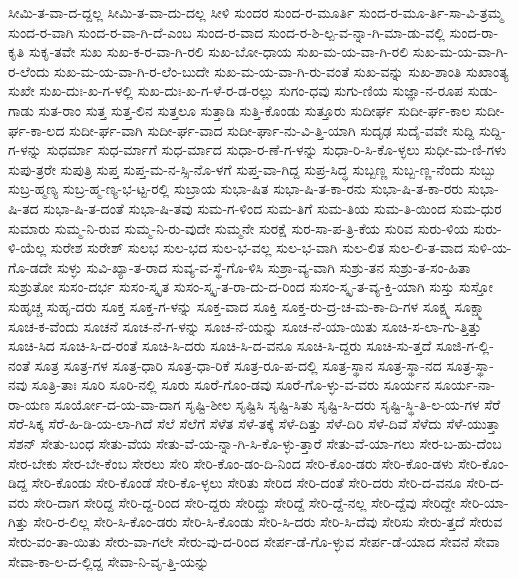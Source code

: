 {ಸೀಮಿ-ತ-ವಾ-ದ-ದ್ದಲ್ಲ
ಸೀಮಿ-ತ-ವಾ-ದು-ದಲ್ಲ
ಸೀಳಿ
ಸುಂದರ
ಸುಂದ-ರ-ಮೂರ್ತಿ
ಸುಂದ-ರ-ಮೂ-ರ್ತಿ-ಸಾ-ವಿ-ತ್ರಮ್ಮ
ಸುಂದ-ರ-ವಾಗಿ
ಸುಂದ-ರ-ವಾ-ಗಿ-ದೆ-ಎಂಬ
ಸುಂದ-ರ-ವಾದ
ಸುಂದ-ರ-ಶಿ-ಲ್ಪ-ವ-ನ್ನಾ-ಗಿ-ಮಾ-ಡು-ವಲ್ಲಿ
ಸುಂದ-ರಾ-ಕೃತಿ
ಸುಕೃ-ತವೇ
ಸುಖ
ಸುಖ-ಕ-ರ-ವಾ-ಗಿ-ರಲಿ
ಸುಖ-ಬೋ-ಧಾಯ
ಸುಖ-ಮ-ಯ-ವಾ-ಗಿ-ರಲಿ
ಸುಖ-ಮ-ಯ-ವಾ-ಗಿ-ರ-ಲೆಂದು
ಸುಖ-ಮ-ಯ-ವಾ-ಗಿ-ರ-ಲೆಂ-ಬುದೇ
ಸುಖ-ಮ-ಯ-ವಾ-ಗಿ-ರು-ವಂತೆ
ಸುಖ-ವನ್ನು
ಸುಖ-ಶಾಂತಿ
ಸುಖಾಂತ್ಯ
ಸುಖೇ
ಸುಖ-ದುಃ-ಖ-ಗ-ಳಲ್ಲಿ
ಸುಖ-ದುಃ-ಖ-ಗ-ಳೆ-ರ-ಡ-ರಲ್ಲು
ಸುಗಂ-ಧವು
ಸುಗು-ಣಿಯ
ಸುಜ್ಞಾ-ನ-ರೂಪ
ಸುಡು-ಗಾಡು
ಸುತ-ರಾಂ
ಸುತ್ತ
ಸುತ್ತ-ಲಿನ
ಸುತ್ತಲೂ
ಸುತ್ತಾಡಿ
ಸುತ್ತಿ-ಕೊಂಡು
ಸುತ್ತೂರು
ಸುದೀರ್ಘ
ಸುದೀ-ರ್ಘ-ಕಾಲ
ಸುದೀ-ರ್ಘ-ಕಾ-ಲದ
ಸುದೀ-ರ್ಘ-ವಾಗಿ
ಸುದೀ-ರ್ಘ-ವಾದ
ಸುದೀ-ರ್ಘಾ-ನು-ವಿ-ತ್ತಿ-ಯಾಗಿ
ಸುದೃಢ
ಸುದೈ-ವವೇ
ಸುದ್ದಿ
ಸುದ್ದಿ-ಗ-ಳನ್ನು
ಸುಧರ್ಮಾ
ಸುಧ-ರ್ಮಾಗೆ
ಸುಧ-ರ್ಮಾದ
ಸುಧಾ-ರ-ಣೆ-ಗ-ಳನ್ನು
ಸುಧಾ-ರಿ-ಸಿ-ಕೊ-ಳ್ಳಲು
ಸುಧೀ-ಮ-ಣಿ-ಗಳು
ಸುಪು-ತ್ರರೇ
ಸುಪುತ್ರಿ
ಸುಪ್ತ
ಸುಪ್ತ-ಮ-ನ-ಸ್ಸಿ-ನೊ-ಳಗೆ
ಸುಪ್ತ-ವಾ-ಗಿದ್ದ
ಸುಪ್ರ-ಸಿದ್ಧ
ಸುಬ್ಬಣ್ಣ
ಸುಬ್ಬ-ಣ್ಣ-ನೆಂದು
ಸುಬ್ಬು
ಸುಬ್ರ-ಹ್ಮಣ್ಯ
ಸುಬ್ರ-ಹ್ಮ-ಣ್ಯ-ಭ-ಟ್ಟ-ರಲ್ಲಿ
ಸುಬ್ರಾಯ
ಸುಭಾ-ಷಿತ
ಸುಭಾ-ಷಿ-ತ-ಕಾ-ರನು
ಸುಭಾ-ಷಿ-ತ-ಕಾ-ರರು
ಸುಭಾ-ಷಿ-ತದ
ಸುಭಾ-ಷಿ-ತ-ದಂತೆ
ಸುಭಾ-ಷಿ-ತವು
ಸುಮ-ಗ-ಳಿಂದ
ಸುಮ-ತಿಗೆ
ಸುಮ-ತಿಯ
ಸುಮ-ತಿ-ಯಿಂದ
ಸುಮ-ಧುರ
ಸುಮಾರು
ಸುಮ್ಮ-ನಿ-ರುವ
ಸುಮ್ಮ-ನಿ-ರು-ವುದೇ
ಸುಮ್ಮನೇ
ಸುರಕ್ಷೆ
ಸುರ-ಸಾ-ಪ-ತ್ರಿ-ಕೆಯ
ಸುರಿವ
ಸುರು-ಳಿಯ
ಸುರು-ಳಿ-ಯೆಲ್ಲ
ಸುರೇಶ
ಸುರೇಶ್
ಸುಲಭ
ಸುಲ-ಭದ
ಸುಲ-ಭ-ವಲ್ಲ
ಸುಲ-ಭ-ವಾಗಿ
ಸುಲ-ಲಿತ
ಸುಲ-ಲಿ-ತ-ವಾದ
ಸುಳಿ-ಯ-ಗೊ-ಡದೇ
ಸುಳ್ಳು
ಸುವಿ-ಖ್ಯಾ-ತ-ರಾದ
ಸುವ್ಯ-ವ-ಸ್ಥೆ-ಗೊ-ಳಿಸಿ
ಸುಶ್ರಾ-ವ್ಯ-ವಾಗಿ
ಸುಶ್ರು-ತನ
ಸುಶ್ರು-ತ-ಸಂ-ಹಿತಾ
ಸುಶ್ರುತೋ
ಸುಸಂ-ದರ್ಭ
ಸುಸಂ-ಸ್ಕೃತ
ಸುಸಂ-ಸ್ಕೃ-ತ-ರಾ-ದು-ದ-ರಿಂದ
ಸುಸಂ-ಸ್ಕೃ-ತ-ವ್ಯ-ಕ್ತಿ-ಯಾಗಿ
ಸುಸ್ತು
ಸುಸ್ತೋ
ಸುಹೃಚ್ಚ
ಸುಹೃ-ದರು
ಸೂಕ್ತ
ಸೂಕ್ತ-ಗ-ಳನ್ನು
ಸೂಕ್ತ-ವಾದ
ಸೂಕ್ತಿ
ಸೂಕ್ತ-ರು-ದ್ರ-ಚ-ಮ-ಕಾ-ದಿ-ಗಳ
ಸೂಕ್ಷ್ಮ
ಸೂಕ್ಷ್ಮಾ
ಸೂಚ-ಕ-ವೆಂದು
ಸೂಚನೆ
ಸೂಚ-ನೆ-ಗ-ಳನ್ನು
ಸೂಚ-ನೆ-ಯನ್ನು
ಸೂಚ-ನೆ-ಯಾ-ಯಿತು
ಸೂಚಿ-ಸ-ಲಾ-ಗು-ತ್ತಿತ್ತು
ಸೂಚಿ-ಸಿದ
ಸೂಚಿ-ಸಿ-ದ-ರಂತೆ
ಸೂಚಿ-ಸಿ-ದರು
ಸೂಚಿ-ಸಿ-ದ-ವನೂ
ಸೂಚಿ-ಸಿ-ದ್ದರು
ಸೂಚಿ-ಸು-ತ್ತದೆ
ಸೂಜಿ-ಗ-ಲ್ಲಿ-ನಂತೆ
ಸೂತ್ರ
ಸೂತ್ರ-ಗಳ
ಸೂತ್ರ-ಧಾರಿ
ಸೂತ್ರ-ಧಾ-ರಿಕೆ
ಸೂತ್ರ-ರೂ-ಪ-ದಲ್ಲಿ
ಸೂತ್ರ-ಸ್ಥಾನ
ಸೂತ್ರ-ಸ್ಥಾ-ನದ
ಸೂತ್ರ-ಸ್ಥಾ-ನವು
ಸೂತ್ರಿ-ತಾಃ
ಸೂರಿ
ಸೂರಿ-ನಲ್ಲಿ
ಸೂರು
ಸೂರೆ-ಗೊಂ-ಡವು
ಸೂರೆ-ಗೊ-ಳ್ಳು-ವ-ವರು
ಸೂರ್ಯನ
ಸೂರ್ಯ-ನಾ-ರಾ-ಯಣ
ಸೂರ್ಯೋ-ದ-ಯ-ವಾ-ದಾಗ
ಸೃಷ್ಟಿ-ಶೀಲ
ಸೃಷ್ಟಿಸಿ
ಸೃಷ್ಟಿ-ಸಿತು
ಸೃಷ್ಟಿ-ಸಿ-ದರು
ಸೃಷ್ಟಿ-ಸ್ಥಿ-ತಿ-ಲ-ಯ-ಗಳ
ಸೆರೆ
ಸೆರೆ-ಸಿಕ್ಕ
ಸೆರೆ-ಹಿ-ಡಿ-ಯ-ಲಾ-ಗಿದೆ
ಸೆಲೆ
ಸೆಲೆಗೆ
ಸೆಳೆತ
ಸೆಳೆ-ತಕ್ಕೆ
ಸೆಳೆ-ದಿತ್ತು
ಸೆಳೆ-ದಿರಿ
ಸೆಳೆ-ದಿವೆ
ಸೆಳೆದು
ಸೆಳೆ-ಯುತ್ತಾ
ಸೆಶನ್
ಸೇತು-ಬಂಧ
ಸೇತು-ವೆಯ
ಸೇತು-ವೆ-ಯ-ನ್ನಾ-ಗಿ-ಸಿ-ಕೊ-ಳ್ಳು-ತ್ತಾರೆ
ಸೇತು-ವೆ-ಯಾ-ಗಲು
ಸೇರ-ಬ-ಹು-ದೆಂಬ
ಸೇರ-ಬೇಕು
ಸೇರ-ಬೇ-ಕೆಂಬ
ಸೇರಲು
ಸೇರಿ
ಸೇರಿ-ಕೊಂ-ಡಂ-ದಿ-ನಿಂದ
ಸೇರಿ-ಕೊಂ-ಡರು
ಸೇರಿ-ಕೊಂ-ಡಳು
ಸೇರಿ-ಕೊಂ-ಡಿದ್ದ
ಸೇರಿ-ಕೊಂಡು
ಸೇರಿ-ಕೊಂಡೆ
ಸೇರಿ-ಕೊ-ಳ್ಳಲು
ಸೇರಿತು
ಸೇರಿದ
ಸೇರಿ-ದಂತೆ
ಸೇರಿ-ದರು
ಸೇರಿ-ದ-ವನೂ
ಸೇರಿ-ದ-ವರು
ಸೇರಿ-ದಾಗ
ಸೇರಿದ್ದ
ಸೇರಿ-ದ್ದ-ರಿಂದ
ಸೇರಿ-ದ್ದರು
ಸೇರಿದ್ದು
ಸೇರಿದ್ದೆ
ಸೇರಿ-ದ್ದೆ-ನಲ್ಲ
ಸೇರಿ-ದ್ದೆವು
ಸೇರಿದ್ದೇ
ಸೇರಿ-ಯಾ-ಗಿತ್ತು
ಸೇರಿ-ರ-ಲಿಲ್ಲ
ಸೇರಿ-ಸಿ-ಕೊಂ-ಡರು
ಸೇರಿ-ಸಿ-ಕೊಂಡು
ಸೇರಿ-ಸಿ-ದರು
ಸೇರಿ-ಸಿ-ದೆವು
ಸೇರಿಸು
ಸೇರು-ತ್ತದೆ
ಸೇರುವ
ಸೇರು-ವಂ-ತಾ-ಯಿತು
ಸೇರು-ವಾ-ಗಲೇ
ಸೇರು-ವು-ದ-ರಿಂದ
ಸೇರ್ಪ-ಡೆ-ಗೊ-ಳ್ಳುವ
ಸೇರ್ಪ-ಡೆ-ಯಾದ
ಸೇವನೆ
ಸೇವಾ
ಸೇವಾ-ಕಾ-ಲ-ದ-ಲ್ಲಿದ್ದ
ಸೇವಾ-ನಿ-ವೃ-ತ್ತಿ-ಯನ್ನು
}
